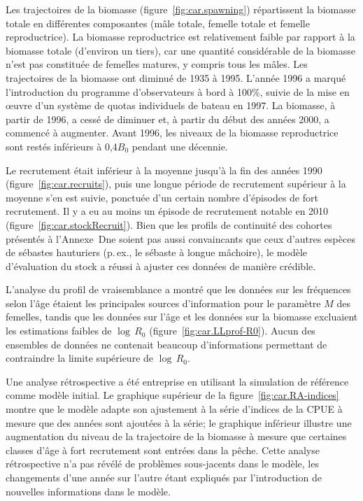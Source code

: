 \documentclass[11pt]{book}
\newcommand{\AppBio}{Annexe~D}
\newcommand{\pc}{\%}
\begin{document}
Les trajectoires de la biomasse (figure~\ref{fig:car.spawning}) r\'{e}partissent la biomasse totale en diff\'{e}rentes composantes (m\^{a}le totale, femelle totale et femelle reproductrice).
La biomasse reproductrice est relativement faible par rapport \`{a} la biomasse totale (d'environ un tiers), car une quantit\'{e} consid\'{e}rable de la biomasse n'est pas constitu\'{e}e de femelles matures, y compris tous les m\^{a}les. Les trajectoires de la biomasse ont diminu\'{e} de 1935 \`{a} 1995.
L'ann\'{e}e 1996 a marqu\'{e} l'introduction du programme d'observateurs \`{a} bord \`{a} 100\pc{}, suivie de la mise en {\oe}uvre d'un syst\`{e}me de quotas individuels de bateau en 1997.
La biomasse, \`{a} partir de 1996, a cess\'{e} de diminuer et, \`{a} partir du d\'{e}but des ann\'{e}es 2000, a commenc\'{e} \`{a} augmenter.
Avant 1996, les niveaux de la biomasse reproductrice sont rest\'{e}s inf\'{e}rieurs \`{a} 0,4$B_0$ pendant une d\'{e}cennie.

Le recrutement \'{e}tait inf\'{e}rieur \`{a} la moyenne jusqu'\`{a} la fin des ann\'{e}es 1990 (figure~\ref{fig:car.recruits}), puis une longue p\'{e}riode de recrutement sup\'{e}rieur \`{a} la moyenne s'en est suivie, ponctu\'{e}e d'un certain nombre d'\'{e}pisodes de fort recrutement.
Il y a eu au moins un \'{e}pisode de recrutement notable en 2010 (figure~\ref{fig:car.stockRecruit}).
Bien que les profils de continuit\'{e} des cohortes pr\'{e}sent\'{e}s \`{a} l'\AppBio ne soient pas aussi convaincants que ceux d'autres esp\`{e}ces de s\'{e}bastes hauturiers (p.\,ex., le s\'{e}baste \`{a} longue m\^{a}choire), le mod\`{e}le d'\'{e}valuation du stock a r\'{e}ussi \`{a} ajuster ces donn\'{e}es de mani\`{e}re cr\'{e}dible.

L'analyse du profil de vraisemblance a montr\'{e} que les donn\'{e}es sur les fr\'{e}quences selon l'\^{a}ge \'{e}taient les principales sources d'information pour le param\`{e}tre $M$ des femelles, tandis que les donn\'{e}es sur l'\^{a}ge et les donn\'{e}es sur la biomasse excluaient les estimations faibles de $\log\,R_0$ (figure~\ref{fig:car.LLprof-R0}).
Aucun des ensembles de donn\'{e}es ne contenait beaucoup d'informations permettant de contraindre la limite sup\'{e}rieure de $\log\,R_0$.

Une analyse r\'{e}trospective a \'{e}t\'{e} entreprise en utilisant la simulation de r\'{e}f\'{e}rence comme mod\`{e}le initial. Le graphique sup\'{e}rieur de la figure~\ref{fig:car.RA-indices} montre que le mod\`{e}le adapte son ajustement \`{a} la s\'{e}rie d'indices de la CPUE \`{a} mesure que des ann\'{e}es sont ajout\'{e}es \`{a} la s\'{e}rie; le graphique inf\'{e}rieur illustre une augmentation du niveau de la trajectoire de la biomasse \`{a} mesure que certaines classes d'\^{a}ge \`{a} fort recrutement sont entr\'{e}es dans la p\^{e}che. Cette analyse r\'{e}trospective n'a pas r\'{e}v\'{e}l\'{e} de probl\`{e}mes sous-jacents dans le mod\`{e}le, les changements d'une ann\'{e}e sur l'autre \'{e}tant expliqu\'{e}s par l'introduction de nouvelles informations dans le mod\`{e}le.
\end{document}
